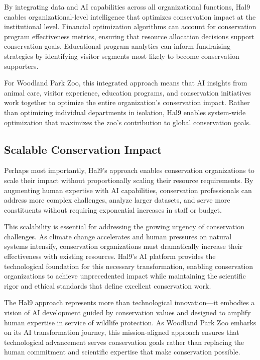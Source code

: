 \documentclass[
  Letterpaper,
]{scrbook}
\begin{document}
By integrating data and AI capabilities across all organizational
functions, Hal9 enables organizational-level intelligence that optimizes
conservation impact at the institutional level. Financial optimization
algorithms can account for conservation program effectiveness metrics,
ensuring that resource allocation decisions support conservation goals.
Educational program analytics can inform fundraising strategies by
identifying visitor segments most likely to become conservation
supporters.

For Woodland Park Zoo, this integrated approach means that AI insights
from animal care, visitor experience, education programs, and
conservation initiatives work together to optimize the entire
organization's conservation impact. Rather than optimizing individual
departments in isolation, Hal9 enables system-wide optimization that
maximizes the zoo's contribution to global conservation goals.

\subsection{Scalable Conservation
Impact}\label{scalable-conservation-impact}

Perhaps most importantly, Hal9's approach enables conservation
organizations to scale their impact without proportionally scaling their
resource requirements. By augmenting human expertise with AI
capabilities, conservation professionals can address more complex
challenges, analyze larger datasets, and serve more constituents without
requiring exponential increases in staff or budget.

This scalability is essential for addressing the growing urgency of
conservation challenges. As climate change accelerates and human
pressures on natural systems intensify, conservation organizations must
dramatically increase their effectiveness with existing resources.
Hal9's AI platform provides the technological foundation for this
necessary transformation, enabling conservation organizations to achieve
unprecedented impact while maintaining the scientific rigor and ethical
standards that define excellent conservation work.

The Hal9 approach represents more than technological innovation---it
embodies a vision of AI development guided by conservation values and
designed to amplify human expertise in service of wildlife protection.
As Woodland Park Zoo embarks on its AI transformation journey, this
mission-aligned approach ensures that technological advancement serves
conservation goals rather than replacing the human commitment and
scientific expertise that make conservation possible.
\end{document}
